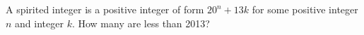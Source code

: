 A spirited integer is a positive integer of form $20^n+13k$ for some positive integer $n$ and integer $k$. How many are less than 2013?
